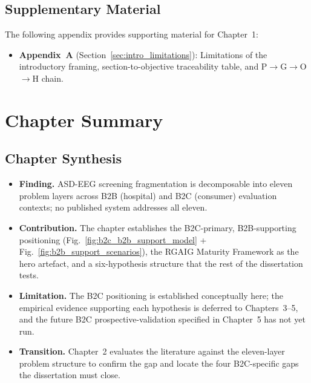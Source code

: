 \subsection{Supplementary Material}

The following appendix provides supporting material for Chapter~1:
\begin{itemize}[leftmargin=*, itemsep=2pt]
\item \textbf{Appendix~A} (Section~\ref{sec:intro_limitations}): Limitations of the introductory framing, section-to-objective traceability table, and P$\to$G$\to$O$\to$H chain.
\end{itemize}


\section{Chapter Summary}

\subsection{Chapter Synthesis}
\label{subsec:ch1_synthesis}

\begin{itemize}[leftmargin=*, itemsep=2pt]
    \item \textbf{Finding.} ASD-EEG screening fragmentation is decomposable into eleven problem layers across B2B (hospital) and B2C (consumer) evaluation contexts; no published system addresses all eleven.
    \item \textbf{Contribution.} The chapter establishes the B2C-primary, B2B-supporting positioning (Fig.~\ref{fig:b2c_b2b_support_model} + Fig.~\ref{fig:b2b_support_scenarios}), the RGAIG Maturity Framework as the hero artefact, and a six-hypothesis structure that the rest of the dissertation tests.
    \item \textbf{Limitation.} The B2C positioning is established conceptually here; the empirical evidence supporting each hypothesis is deferred to Chapters~3--5, and the future B2C prospective-validation specified in Chapter~5 has not yet run.
    \item \textbf{Transition.} Chapter~2 evaluates the literature against the eleven-layer problem structure to confirm the gap and locate the four B2C-specific gaps the dissertation must close.
\end{itemize}



